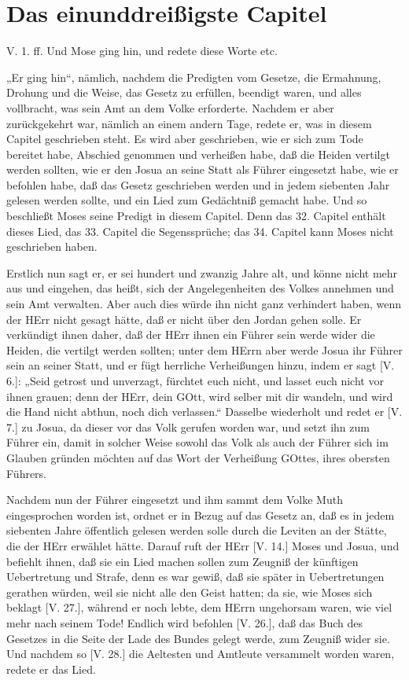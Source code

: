 \section{Das einunddreißigste Capitel}

\begin{schriftzitat}
V. 1. ff. Und Mose ging hin, und redete diese Worte etc.
\end{schriftzitat}

„Er ging hin“, nämlich, nachdem die Predigten vom Gesetze, die Ermahnung, Drohung und die Weise, das Gesetz zu erfüllen, beendigt waren, und alles vollbracht, was sein Amt an dem Volke erforderte. Nachdem er aber zurückgekehrt war, nämlich an einem andern Tage, redete er, was in diesem Capitel geschrieben steht. Es wird aber geschrieben, wie er sich zum Tode bereitet habe, Abschied genommen und verheißen habe, daß die Heiden vertilgt werden sollten, wie er den Josua an seine Statt als Führer eingesetzt habe, wie er befohlen habe, daß das Gesetz geschrieben werden und in jedem siebenten Jahr gelesen werden sollte, und ein Lied zum Gedächtniß gemacht habe. Und so beschließt Moses seine Predigt in diesem Capitel. Denn das 32. Capitel enthält dieses Lied, das 33. Capitel die Segenssprüche; das 34. Capitel kann Moses nicht geschrieben haben.

Erstlich nun sagt er, er sei hundert und zwanzig Jahre alt, und könne nicht mehr aus und eingehen, das heißt, sich der Angelegenheiten des Volkes annehmen und sein Amt verwalten. Aber auch dies würde ihn nicht ganz verhindert haben, wenn der HErr nicht gesagt hätte, daß er nicht über den Jordan gehen solle. Er verkündigt ihnen daher, daß der HErr ihnen ein Führer sein werde wider die Heiden, die vertilgt werden sollten; unter dem HErrn aber werde Josua ihr Führer sein an seiner Statt, und er fügt herrliche Verheißungen hinzu, indem er sagt [V. 6.]: „Seid getrost und unverzagt, fürchtet euch nicht, und lasset euch nicht vor ihnen grauen; denn der HErr, dein GOtt, wird selber mit dir wandeln, und wird die Hand nicht abthun, noch dich verlassen.“ Dasselbe wiederholt und redet er [V. 7.] zu Josua, da dieser vor das Volk gerufen worden war, und setzt ihn zum Führer ein, damit in solcher Weise sowohl das Volk als auch der Führer sich im Glauben gründen möchten auf das Wort der Verheißung GOttes, ihres obersten Führers.

Nachdem nun der Führer eingesetzt und ihm sammt dem Volke Muth eingesprochen worden ist, ordnet er in Bezug auf das Gesetz an, daß es in jedem siebenten Jahre öffentlich gelesen werden solle durch die Leviten an der Stätte, die der HErr erwählet hätte. Darauf ruft der HErr [V. 14.] Moses und Josua, und befiehlt ihnen, daß sie ein Lied machen sollen zum Zeugniß der künftigen Uebertretung und Strafe, denn es war gewiß, daß sie später in Uebertretungen gerathen
würden, weil sie nicht alle den Geist hatten; da sie, wie Moses sich beklagt [V. 27.], während er noch lebte, dem HErrn ungehorsam waren, wie viel mehr nach seinem Tode! Endlich wird befohlen [V. 26.], daß das Buch des Gesetzes in die Seite der Lade des Bundes gelegt werde, zum Zeugniß wider sie. Und nachdem so [V. 28.] die Aeltesten und Amtleute versammelt worden waren, redete er das Lied.

